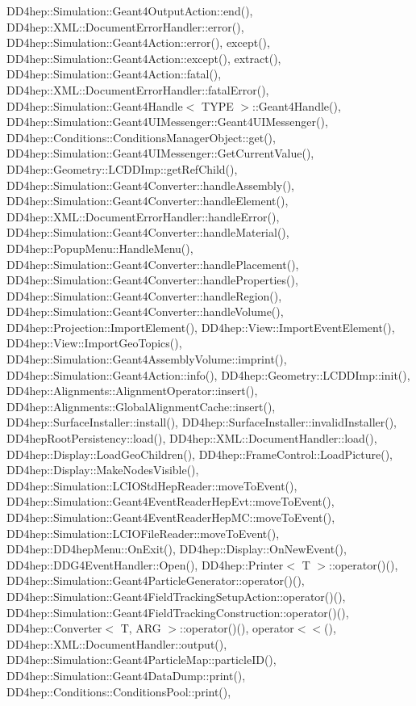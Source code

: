 D\+D4hep\+::\+Simulation\+::\+Geant4\+Output\+Action\+::end(), D\+D4hep\+::\+X\+M\+L\+::\+Document\+Error\+Handler\+::error(), D\+D4hep\+::\+Simulation\+::\+Geant4\+Action\+::error(), except(), D\+D4hep\+::\+Simulation\+::\+Geant4\+Action\+::except(), extract(), D\+D4hep\+::\+Simulation\+::\+Geant4\+Action\+::fatal(), D\+D4hep\+::\+X\+M\+L\+::\+Document\+Error\+Handler\+::fatal\+Error(), D\+D4hep\+::\+Simulation\+::\+Geant4\+Handle$<$ T\+Y\+P\+E $>$\+::\+Geant4\+Handle(), D\+D4hep\+::\+Simulation\+::\+Geant4\+U\+I\+Messenger\+::\+Geant4\+U\+I\+Messenger(), D\+D4hep\+::\+Conditions\+::\+Conditions\+Manager\+Object\+::get(), D\+D4hep\+::\+Simulation\+::\+Geant4\+U\+I\+Messenger\+::\+Get\+Current\+Value(), D\+D4hep\+::\+Geometry\+::\+L\+C\+D\+D\+Imp\+::get\+Ref\+Child(), D\+D4hep\+::\+Simulation\+::\+Geant4\+Converter\+::handle\+Assembly(), D\+D4hep\+::\+Simulation\+::\+Geant4\+Converter\+::handle\+Element(), D\+D4hep\+::\+X\+M\+L\+::\+Document\+Error\+Handler\+::handle\+Error(), D\+D4hep\+::\+Simulation\+::\+Geant4\+Converter\+::handle\+Material(), D\+D4hep\+::\+Popup\+Menu\+::\+Handle\+Menu(), D\+D4hep\+::\+Simulation\+::\+Geant4\+Converter\+::handle\+Placement(), D\+D4hep\+::\+Simulation\+::\+Geant4\+Converter\+::handle\+Properties(), D\+D4hep\+::\+Simulation\+::\+Geant4\+Converter\+::handle\+Region(), D\+D4hep\+::\+Simulation\+::\+Geant4\+Converter\+::handle\+Volume(), D\+D4hep\+::\+Projection\+::\+Import\+Element(), D\+D4hep\+::\+View\+::\+Import\+Event\+Element(), D\+D4hep\+::\+View\+::\+Import\+Geo\+Topics(), D\+D4hep\+::\+Simulation\+::\+Geant4\+Assembly\+Volume\+::imprint(), D\+D4hep\+::\+Simulation\+::\+Geant4\+Action\+::info(), D\+D4hep\+::\+Geometry\+::\+L\+C\+D\+D\+Imp\+::init(), D\+D4hep\+::\+Alignments\+::\+Alignment\+Operator\+::insert(), D\+D4hep\+::\+Alignments\+::\+Global\+Alignment\+Cache\+::insert(), D\+D4hep\+::\+Surface\+Installer\+::install(), D\+D4hep\+::\+Surface\+Installer\+::invalid\+Installer(), D\+D4hep\+Root\+Persistency\+::load(), D\+D4hep\+::\+X\+M\+L\+::\+Document\+Handler\+::load(), D\+D4hep\+::\+Display\+::\+Load\+Geo\+Children(), D\+D4hep\+::\+Frame\+Control\+::\+Load\+Picture(), D\+D4hep\+::\+Display\+::\+Make\+Nodes\+Visible(), D\+D4hep\+::\+Simulation\+::\+L\+C\+I\+O\+Std\+Hep\+Reader\+::move\+To\+Event(), D\+D4hep\+::\+Simulation\+::\+Geant4\+Event\+Reader\+Hep\+Evt\+::move\+To\+Event(), D\+D4hep\+::\+Simulation\+::\+Geant4\+Event\+Reader\+Hep\+M\+C\+::move\+To\+Event(), D\+D4hep\+::\+Simulation\+::\+L\+C\+I\+O\+File\+Reader\+::move\+To\+Event(), D\+D4hep\+::\+D\+D4hep\+Menu\+::\+On\+Exit(), D\+D4hep\+::\+Display\+::\+On\+New\+Event(), D\+D4hep\+::\+D\+D\+G4\+Event\+Handler\+::\+Open(), D\+D4hep\+::\+Printer$<$ T $>$\+::operator()(), D\+D4hep\+::\+Simulation\+::\+Geant4\+Particle\+Generator\+::operator()(), D\+D4hep\+::\+Simulation\+::\+Geant4\+Field\+Tracking\+Setup\+Action\+::operator()(), D\+D4hep\+::\+Simulation\+::\+Geant4\+Field\+Tracking\+Construction\+::operator()(), D\+D4hep\+::\+Converter$<$ T, A\+R\+G $>$\+::operator()(), operator$<$$<$(), D\+D4hep\+::\+X\+M\+L\+::\+Document\+Handler\+::output(), D\+D4hep\+::\+Simulation\+::\+Geant4\+Particle\+Map\+::particle\+I\+D(), D\+D4hep\+::\+Simulation\+::\+Geant4\+Data\+Dump\+::print(), D\+D4hep\+::\+Conditions\+::\+Conditions\+Pool\+::print(), 